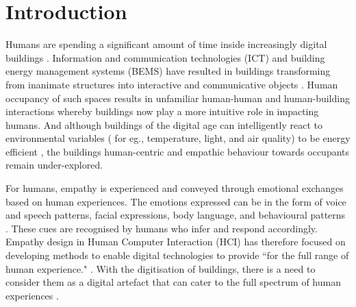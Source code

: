 \documentclass[manuscript, anonymous, review]{acmart}
\begin{document}



 
\maketitle

\section{Introduction}

Humans are spending a significant amount of time inside increasingly digital buildings \cite{alavi2016future}. Information and communication technologies (ICT) and building energy management systems (BEMS) have resulted in buildings transforming from inanimate structures into interactive and communicative objects \cite{nembrini2017human}. Human occupancy of such spaces results in unfamiliar human-human and human-building interactions whereby buildings now play a more intuitive role in impacting humans. And although buildings of the digital age can intelligently react to environmental variables ( for eg., temperature, light, and air quality) to be energy efficient \cite{bluyssen2009indoor, moreno2014user}, the buildings human-centric and empathic behaviour towards occupants remain under-explored. 

For humans, empathy is experienced and conveyed through emotional exchanges based on human experiences. The emotions expressed can be in the form of voice and speech patterns, facial expressions, body language, and behavioural patterns \cite{riess2017science}. These cues are recognised by humans who infer and respond accordingly. Empathy design in Human Computer Interaction (HCI) has therefore focused on developing methods to enable digital technologies to provide ``for the full range of human experience." \cite{wright2008empathy}. With the digitisation of buildings, there is a need to consider them as a digital artefact that can cater to the full spectrum of human experiences \cite{derix2014empathic}. 
\end{document}
